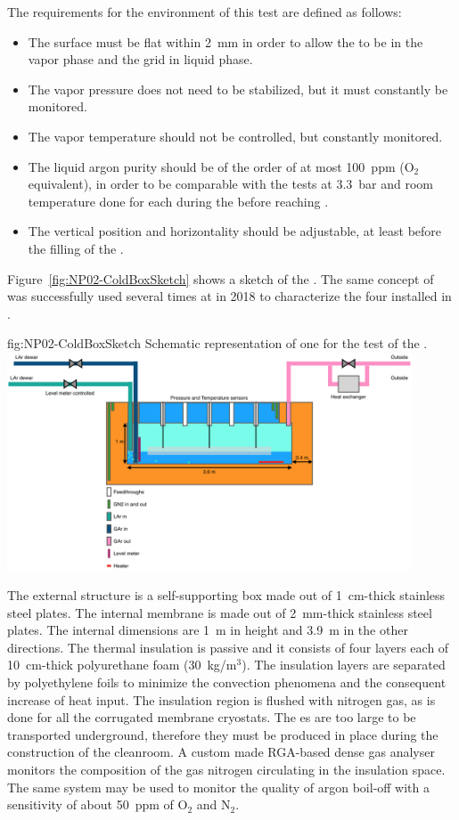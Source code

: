 The requirements for the environment of this test are defined as follows:
\begin{itemize}
\item The  surface must be flat within 2~mm in order to allow the  to be in the vapor phase and the grid in liquid phase.
\item The vapor pressure does not need to be stabilized, but it must constantly be monitored.
\item The vapor temperature should not be controlled, but constantly monitored.
\item The liquid argon purity should be of the order of at most 100~ppm (O$_2$ equivalent), in order to be comparable with the tests at 3.3~bar and room temperature done for each  during the  before reaching \surf.
\item The  vertical position and horizontality should be adjustable, at least before the filling of the  \coldbox.
\end{itemize}

Figure~\ref{fig:NP02-ColdBoxSketch} shows a sketch of the  \coldbox.
The same concept of  \coldbox was successfully used several times at  in 2018 to characterize the four  installed in .
\begin{dunefigure}{fig:NP02-ColdBoxSketch}
{Schematic representation of one \coldbox for the test of the .}
\includegraphics[width=0.9\textwidth]{graphics/NP02-ColdBoxSketch.png}
\end{dunefigure}
The external structure is a self-supporting box made out of 1~cm-thick stainless steel plates.
The internal membrane is made out of 2~mm-thick stainless steel plates.
The internal dimensions are 1~m in height and 3.9~m in the other directions.
The thermal insulation is passive and it consists of four layers each of 10~cm-thick polyurethane foam (30~kg/m$^3$).
The insulation layers are separated by polyethylene foils to minimize the convection phenomena and the consequent increase of heat input.
The insulation region is flushed with  nitrogen gas, as is done for all the corrugated membrane cryostats.
The  \coldbox{}es are too large to be transported underground, therefore they must be produced in place during the construction of the cleanroom.
A custom made RGA-based dense gas analyser monitors the composition of the gas nitrogen circulating in the insulation space.
The same system may be used to monitor the quality of argon boil-off with a sensitivity of about 50~ppm of O$_2$ and N$_2$.

